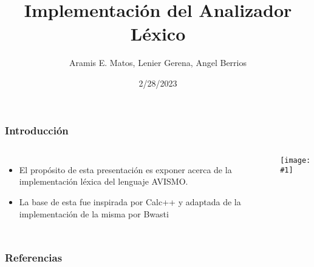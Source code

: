 \documentclass[14pt, aspectratio=169]{beamer}
\title{Implementación del Analizador Léxico}
\author{Aramis E. Matos, Lenier Gerena, Angel Berrios}
\date{2/28/2023}
\newcommand {\scaledimage}[1] {
    \texttt{[image: \#1]}
}
\begin{document}
\maketitle

\begin{frame}
    \frametitle{Introducción}
    \begin{columns}
        \small
        \begin{itemize}
            \item El propósito de esta presentación es exponer acerca de la implementación léxica del lenguaje AVISMO.
            \item La base de esta fue inspirada por Calc++ \cite{noauthor_complete_nodate} y adaptada de la implementación de la misma por Bwasti \cite{wasti_bwastibison-example-calc-_2020}
        \end{itemize}
        \scaledimage{chemical.png}
    \end{columns}
\end{frame}


\begin{frame}
    \frametitle{Referencias}
    
    
\end{frame}
\end{document}
